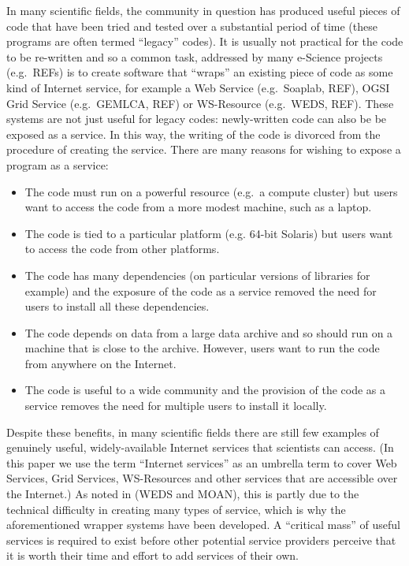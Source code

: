 \documentclass{llncs}
\begin{document}
In many scientific fields, the community in question has produced useful pieces of code that have been tried and tested over a substantial period of time (these programs are often termed ``legacy'' codes).  It is usually not practical for the code to be re-written and so a common task, addressed by many e-Science projects (e.g.\ REFs) is to create software that ``wraps'' an existing piece of code as some kind of Internet service, for example a Web Service (e.g.\ Soaplab, REF), OGSI Grid Service (e.g.\ GEMLCA, REF) or WS-Resource (e.g.\ WEDS, REF).  These systems are not just useful for legacy codes: newly-written code can also be be exposed as a service.  In this way, the writing of the code is divorced from the procedure of creating the service.  There are many reasons for wishing to expose a program as a service:
\begin{itemize}
	\item The code must run on a powerful resource (e.g.\ a compute cluster) but users want to access the code from a more modest machine, such as a laptop.
	\item The code is tied to a particular platform (e.g. 64-bit Solaris) but users want to access the code from other platforms.
	\item The code has many dependencies (on particular versions of libraries for example) and the exposure of the code as a service removed the need for users to install all these dependencies.
	\item The code depends on data from a large data archive and so should run on a machine that is close to the archive.  However, users want to run the code from anywhere on the Internet.
	\item The code is useful to a wide community and the provision of the code as a service removes the need for multiple users to install it locally.
\end{itemize}

Despite these benefits, in many scientific fields there are still few examples of genuinely useful, widely-available Internet services that scientists can access.  (In this paper we use the term ``Internet services'' as an umbrella term to cover Web Services, Grid Services, WS-Resources and other services that are accessible over the Internet.)  As noted in (WEDS and MOAN), this is partly due to the technical difficulty in creating many types of service, which is why the aforementioned wrapper systems have been developed.  A ``critical mass'' of useful services is required to exist before other potential service providers perceive that it is worth their time and effort to add services of their own.
\end{document}
